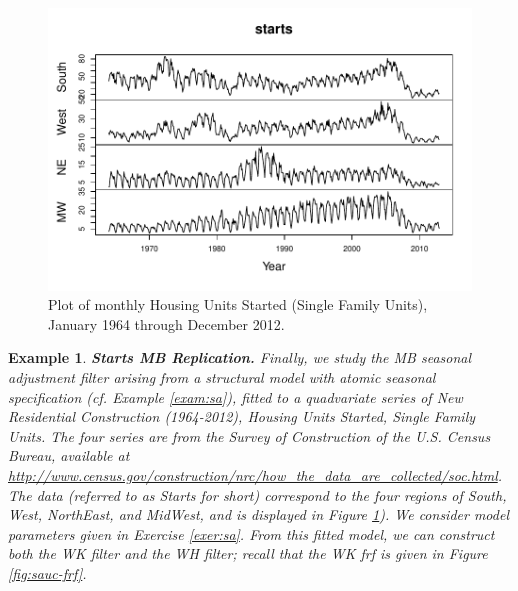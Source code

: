 \documentclass[a4paper]{book}
\newtheorem{Example}{Example}
\begin{document}
\begin{figure}[htb!]
\begin{center}
\includegraphics[]{starts_data.pdf}
\caption{Plot of monthly  Housing Units Started (Single Family Units),
  January 1964 through December 2012. }
\label{fig:starts_data}
\end{center}
\end{figure}  

\begin{Example} {\bf Starts MB Replication.} \rm
\label{exam:starts-mb}
Finally, we  study the  MB seasonal adjustment filter arising from a
 structural model with atomic seasonal specification
(cf. Example \ref{exam:sa}),  fitted
 to a   quadvariate   series of  
 New Residential Construction (1964-2012), Housing Units Started, Single Family
Units.   The four series are from the Survey of Construction of the U.S. Census Bureau, available at 
\url{http://www.census.gov/construction/nrc/how_the_data_are_collected/soc.html}.
  The data (referred to as Starts for short)  correspond to the four regions of South, West, NorthEast, and MidWest, and is 
  displayed in  Figure \ref{fig:starts_data}).
  We consider  model parameters  given in Exercise \ref{exer:sa}.
     From this fitted model,  we can construct both the WK filter 
   and the WH filter; recall that the WK frf is given in Figure \ref{fig:sauc-frf}.
\end{Example}
 
\end{document}
